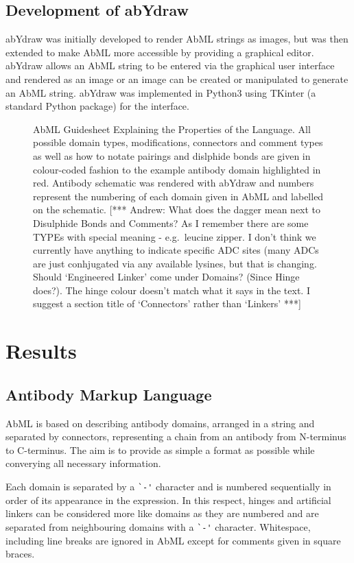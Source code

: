 \documentclass[a4]{article}
\newcommand{\andrew}[1]{{\color{red} [*** Andrew: #1 ***]}}
\begin{document}
\subsection{Development of abYdraw}
abYdraw was initially developed to render AbML strings as images, but
was then extended to make AbML more accessible by providing a
graphical editor. abYdraw allows an AbML string to be entered via
the graphical user interface and rendered as an image or an image can
be created or manipulated to generate an AbML string.
abYdraw was implemented in Python3 using TKinter (a standard Python
package) for the interface.


\begin{figure}
\caption{\label{fig:1} AbML Guidesheet Explaining the Properties of
the Language. All possible domain types, modifications, connectors and
comment types as well as how to notate pairings and dislphide bonds
are given in colour-coded fashion to the example antibody domain
highlighted in red. Antibody schematic was rendered with abYdraw and
numbers represent the numbering of each domain given in AbML and
labelled on the schematic. \andrew{What does the dagger mean next
  to Disulphide Bonds and Comments? As I remember there are some
  TYPEs with special meaning - e.g.\ leucine zipper. I don't think
  we currently have anything to indicate specific ADC sites (many
  ADCs are just conhjugated via any available lysines, but that is
  changing. Should `Engineered Linker' come under Domains? (Since
  Hinge does?). The hinge colour doesn't match what it says in the
  text. I suggest a section title of `Connectors' rather than
  `Linkers'}}
\end{figure}

\section{Results}

\subsection{Antibody Markup Language}
AbML is based on describing antibody domains, arranged in a string and
separated by connectors, representing a chain from an antibody
from N-terminus to C-terminus. The aim is to provide as simple a format
as possible while converying all necessary information.

Each domain is separated by a
\verb|`-'| character and is numbered sequentially in
order of its appearance in the expression. 
In this respect, hinges and artificial linkers can be considered more
like domains as they are numbered and are separated from neighbouring
domains with a \verb|`-'| character.
Whitespace, including line breaks are ignored in AbML
except for comments given in square braces.
\end{document}
